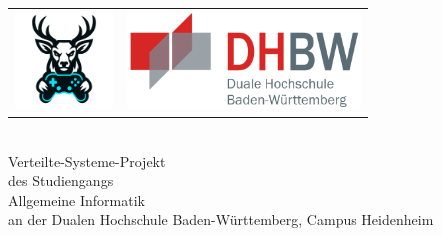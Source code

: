 
\begin{titlepage}
	\begin{longtable}{p{} p{}}
	  {\includegraphics[height=2.6cm]{images/logo.png}} & 
	  {\includegraphics[height=2.6cm]{images/dhbw.png}}
	\end{longtable}
	\enlargethispage{20mm}
	\begin{center}
	\vspace*{12mm}	{\LARGE\bf \titel }\\
    \vspace*{12mm} Verteilte-Systeme-Projekt\\
    \vspace*{3mm} des Studiengangs\\
    \vspace*{3mm} Allgemeine Informatik\\
    \vspace*{12mm} an der Dualen Hochschule Baden-Württemberg, Campus Heidenheim\\

\end{center}
\end{titlepage}
